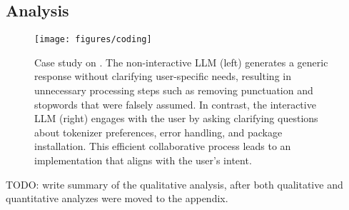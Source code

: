 \subsection{Analysis}
\label{sec:case}

\begin{figure*}[t]
    \centering
    \texttt{[image: figures/coding]}
    \vspace{-10pt}
    \caption{Case study on \codet. The non-interactive LLM (left) generates a generic response without clarifying user-specific needs, resulting in unnecessary processing steps such as removing punctuation and stopwords that were falsely assumed. In contrast, the interactive LLM (right) engages with the user by asking clarifying questions about tokenizer preferences, error handling, and package installation. This efficient collaborative process leads to an implementation that aligns with the user’s intent. }
    \label{fig:coding}
\end{figure*}

TODO: write summary of the qualitative analysis, after both qualitative and quantitative analyzes were moved to the appendix.

